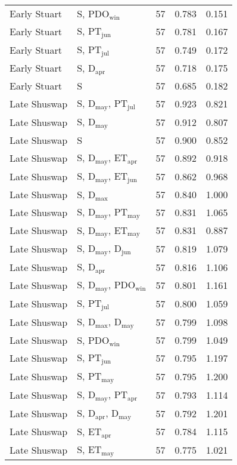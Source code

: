 \begin{longtable}{llrrr}
Early Stuart & S, PDO$_\mathrm{win}$ & 57 & 0.783 & 0.151 \\ 
Early Stuart & S, PT$_\mathrm{jun}$ & 57 & 0.781 & 0.167 \\ 
Early Stuart & S, PT$_\mathrm{jul}$ & 57 & 0.749 & 0.172 \\ 
Early Stuart & S, D$_\mathrm{apr}$ & 57 & 0.718 & 0.175 \\ 
Early Stuart & S & 57 & 0.685 & 0.182 \\
Late Shuswap & S, D$_\mathrm{may}$, PT$_\mathrm{jul}$ & 57 & 0.923 & 0.821 \\ 
Late Shuswap & S, D$_\mathrm{may}$ & 57 & 0.912 & 0.807 \\ 
Late Shuswap & S & 57 & 0.900 & 0.852 \\
Late Shuswap & S, D$_\mathrm{may}$, ET$_\mathrm{apr}$ & 57 & 0.892 & 0.918 \\ 
Late Shuswap & S, D$_\mathrm{may}$, ET$_\mathrm{jun}$ & 57 & 0.862 & 0.968 \\ 
Late Shuswap & S, D$_\mathrm{max}$ & 57 & 0.840 & 1.000 \\ 
Late Shuswap & S, D$_\mathrm{may}$, PT$_\mathrm{may}$ & 57 & 0.831 & 1.065 \\ 
Late Shuswap & S, D$_\mathrm{may}$, ET$_\mathrm{may}$ & 57 & 0.831 & 0.887 \\ 
Late Shuswap & S, D$_\mathrm{may}$, D$_\mathrm{jun}$ & 57 & 0.819 & 1.079 \\ 
Late Shuswap & S, D$_\mathrm{apr}$ & 57 & 0.816 & 1.106 \\ 
Late Shuswap & S, D$_\mathrm{may}$, PDO$_\mathrm{win}$ & 57 & 0.801 & 1.161 \\ 
Late Shuswap & S, PT$_\mathrm{jul}$ & 57 & 0.800 & 1.059 \\ 
Late Shuswap & S, D$_\mathrm{max}$, D$_\mathrm{may}$ & 57 & 0.799 & 1.098 \\ 
Late Shuswap & S, PDO$_\mathrm{win}$ & 57 & 0.799 & 1.049 \\ 
Late Shuswap & S, PT$_\mathrm{jun}$ & 57 & 0.795 & 1.197 \\ 
Late Shuswap & S, PT$_\mathrm{may}$ & 57 & 0.795 & 1.200 \\ 
Late Shuswap & S, D$_\mathrm{may}$, PT$_\mathrm{apr}$ & 57 & 0.793 & 1.114 \\ 
Late Shuswap & S, D$_\mathrm{apr}$, D$_\mathrm{may}$ & 57 & 0.792 & 1.201 \\ 
Late Shuswap & S, ET$_\mathrm{apr}$ & 57 & 0.784 & 1.115 \\ 
Late Shuswap & S, ET$_\mathrm{may}$ & 57 & 0.775 & 1.021 \\ 

\end{longtable}
